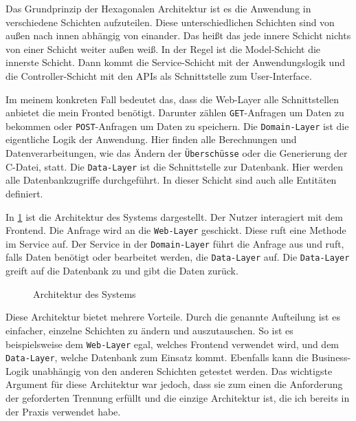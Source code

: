 Das Grundprinzip der Hexagonalen Architektur ist es die Anwendung in verschiedene Schichten aufzuteilen.
Diese unterschiedlichen Schichten sind von außen nach innen abhängig von einander. Das heißt das jede innere Schicht nichts von einer Schicht weiter außen weiß.
In der Regel ist die Model-Schicht die innerste Schicht.
Dann kommt die Service-Schicht mit der Anwendungslogik und die Controller-Schicht mit den APIs als Schnittstelle zum User-Interface.

Im meinem konkreten Fall bedeutet das, dass die Web-Layer alle Schnittstellen anbietet die mein Fronted benötigt. Darunter zählen \texttt{GET}-Anfragen um Daten zu bekommen oder
\texttt{POST}-Anfragen um Daten zu speichern.
Die \texttt{Domain-Layer} ist die eigentliche Logik der Anwendung. Hier finden alle Berechnungen und Datenverarbeitungen, wie das Ändern der \texttt{Überschüsse} oder die Generierung der C-Datei, statt.
Die \texttt{Data-Layer} ist die Schnittstelle zur Datenbank. Hier werden alle Datenbankzugriffe durchgeführt. In dieser Schicht sind auch alle Entitäten definiert.

In \ref{fig:architecture} ist die Architektur des Systems dargestellt. Der Nutzer interagiert mit dem Frontend. Die Anfrage wird an die \texttt{Web-Layer} geschickt. 
Diese ruft eine Methode im Service auf. Der Service in der \texttt{Domain-Layer} führt die Anfrage aus und ruft, falls Daten benötigt oder bearbeitet werden, die \texttt{Data-Layer} auf.
Die \texttt{Data-Layer} greift auf die Datenbank zu und gibt die Daten zurück.

\begin{figure}[htbp]
  \resizebox{\textwidth}{!}{}
  \caption{Architektur des Systems}
  \label{fig:architecture}
\end{figure}

Diese Architektur bietet mehrere Vorteile. Durch die genannte Aufteilung ist es einfacher, einzelne Schichten zu ändern und auszutauschen. 
So ist es beispielsweise dem \texttt{Web-Layer} egal, welches Frontend verwendet wird, und dem \texttt{Data-Layer}, welche Datenbank zum Einsatz kommt.
Ebenfalls kann die Business-Logik unabhängig von den anderen Schichten getestet werden.
Das wichtigste Argument für diese Architektur war jedoch, dass sie zum einen die Anforderung der geforderten Trennung erfüllt und die einzige Architektur ist, die ich bereits in der Praxis verwendet habe.